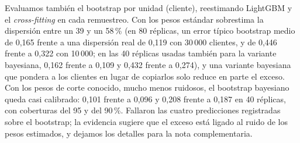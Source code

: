 Evaluamos también el bootstrap por unidad (cliente), reestimando LightGBM y el \emph{cross-fitting} en cada remuestreo. Con los pesos estándar sobrestima la dispersión entre un 39 y un 58\,\% (en 80 réplicas, un error típico bootstrap medio de 0,165 frente a una dispersión real de 0,119 con 30\,000 clientes, y de 0,446 frente a 0,322 con 10\,000; en las 40 réplicas usadas también para la variante bayesiana, 0,162 frente a 0,109 y 0,432 frente a 0,274), y una variante bayesiana que pondera a los clientes en lugar de copiarlos solo reduce en parte el exceso. Con los pesos de corte conocido, mucho menos ruidosos, el bootstrap bayesiano queda casi calibrado: 0,101 frente a 0,096 y 0,208 frente a 0,187 en 40 réplicas, con coberturas del 95 y del 90\,\%. Fallaron las cuatro predicciones registradas sobre el bootstrap; la evidencia sugiere que el exceso está ligado al ruido de los pesos estimados, y dejamos los detalles para la nota complementaria.

